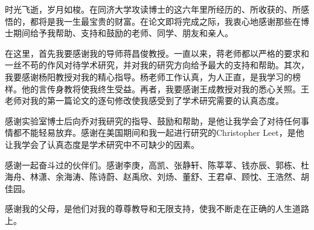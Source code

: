时光飞逝，岁月如梭。在同济大学攻读博士的这六年里所经历的、所收获的、所感悟的，都将是我一生最宝贵的财富。在论文即将完成之际，我衷心地感谢那些在博士期间给予我帮助、支持和鼓励的老师、同学、朋友和亲人。

在这里，首先我要感谢我的导师蒋昌俊教授。一直以来，蒋老师都以严格的要求和一丝不苟的作风对待学术研究，并对我的研究方向给予最大的支持和帮助。其次，我要感谢杨阳教授对我的精心指导。杨老师工作认真，为人正直，是我学习的榜样。他的言传身教将使我终生受益。再者，我要感谢王成教授对我的悉心关照。王老师对我的第一篇论文的逐句修改使我感受到了学术研究需要的认真态度。

感谢实验室博士后向乔对我研究的指导、鼓励和帮助，是他让我学会了对待任何事情都不能轻易放弃。感谢在美国期间和我一起进行研究的Christopher Leet，是他让我学会了认真态度是学术研究中不可缺少的因素。

感谢一起奋斗过的伙伴们。感谢李庚，高凯、张静轩、陈莘莘、钱亦辰、郭栋、杜海舟、林潇、余海涛、陈诗蔚、赵禹欣、刘炀、董舒、王君卓、顾忱、王浩然、胡佳园。

感谢我的父母，是他们对我的尊尊教导和无限支持，使我不断走在正确的人生道路上。
